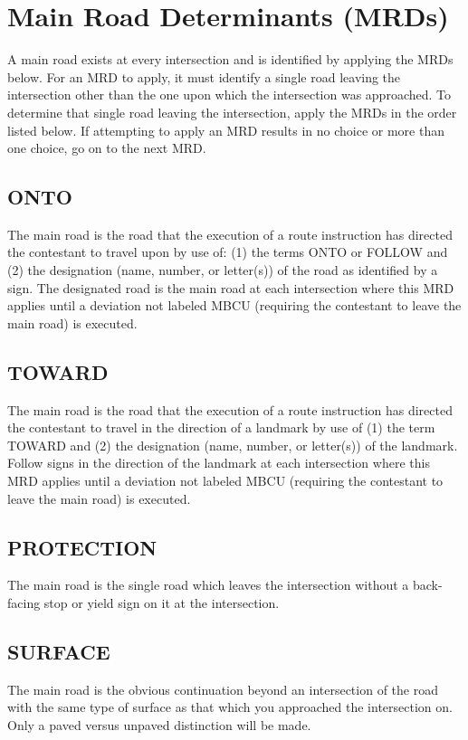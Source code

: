 \section{Main Road Determinants (MRDs)}
\label{sec:mrd} A main road exists at every intersection and is identified by applying the MRDs below.  For an MRD to apply, it must identify a single road leaving the intersection other than the one upon which the intersection was approached.  To determine that single road leaving the intersection, apply the MRDs in the order listed below.  If attempting to apply an MRD results in no choice or more than one choice, go on to the next MRD.

\subsection{ONTO}
The main road is the road that the execution of a route instruction has directed the contestant to travel upon by use of: (1) the terms ONTO or FOLLOW and (2) the designation (name, number, or letter(s)) of the road as identified by a sign.  The designated road is the main road at each intersection where this MRD applies until a deviation not labeled MBCU (requiring the contestant to leave the main road) is executed.

\subsection{TOWARD}
The main road is the road that the execution of a route instruction has directed the contestant to travel in the direction of a landmark by use of (1) the term TOWARD and (2) the designation (name, number, or letter(s)) of the landmark.  Follow signs in the direction of the landmark at each intersection where this MRD applies until a deviation not labeled MBCU (requiring the contestant to leave the main road) is executed.

\subsection{PROTECTION}
The main road is the single road which leaves the intersection without a back-facing stop or yield sign on it at the intersection.

\subsection{SURFACE}
The main road is the obvious continuation beyond an intersection of the road with the same type of surface as that which you approached the intersection on.  Only a paved versus unpaved distinction will be made.

